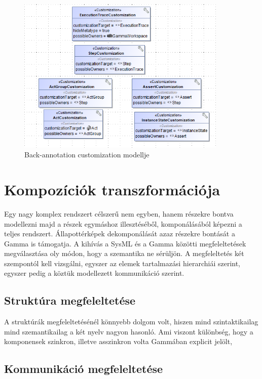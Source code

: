 \begin{figure}[!ht]
	\centering
	\includegraphics[width=100mm, keepaspectratio]{figures/contribution/trace-profile.png}
	\caption{Back-annotation customization modellje}
	\label{fig:contribution-trace-customization}
\end{figure}
 


\section{Kompozíciók transzformációja}

Egy nagy komplex rendszert célszerű nem egyben, hanem részekre bontva modellezni majd a részek egymáshoz illesztéséből, komponálásából képezni a teljes rendszert. Állapottérképek dekomponálását azaz részekre bontását a Gamma is támogatja. A kihívás a SysML és a Gamma közötti megfeleltetések megválasztása oly módon, hogy a szemantika ne sérüljön. A megfeleltetés két szempontól kell vizsgálni, egyszer az elemek tartalmazási hierarchiái szerint, egyszer pedig a köztük modellezett kommunikáció szerint.

\subsection{Struktúra megfeleltetése}
A struktúrák megfeleltetésénél könnyebb dolgom volt, hiszen mind szintaktikailag mind szemantikailag a két nyelv nagyon hasonló. Ami viszont különbség, hogy a komponensek szinkron, illetve asszinkron volta Gammában explicit jelölt, %

\subsection{Kommunikáció megfeleltetése}

